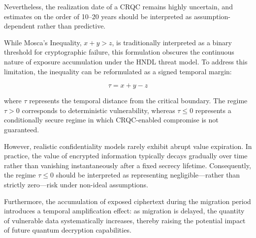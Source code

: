 \documentclass[11pt,a4paper]{article}
\begin{document}
Nevertheless, the realization date of a CRQC remains highly uncertain, and estimates on the order of 10--20 years should be interpreted as assumption-dependent rather than predictive.

While Mosca’s Inequality, $x + y > z$, is traditionally interpreted as a binary threshold for cryptographic failure, this formulation obscures the continuous nature of exposure accumulation under the HNDL threat model. To address this limitation, the inequality can be reformulated as a signed temporal margin:

\[
\tau = x + y - z
\]

where $\tau$ represents the temporal distance from the critical boundary. The regime $\tau > 0$ corresponds to deterministic vulnerability, whereas $\tau \leq 0$ represents a conditionally secure regime in which CRQC-enabled compromise is not guaranteed.

However, realistic confidentiality models rarely exhibit abrupt value expiration. In practice, the value of encrypted information typically decays gradually over time rather than vanishing instantaneously after a fixed secrecy lifetime. Consequently, the regime $\tau \leq 0$ should be interpreted as representing negligible---rather than strictly zero---risk under non-ideal assumptions.

Furthermore, the accumulation of exposed ciphertext during the migration period introduces a temporal amplification effect: as migration is delayed, the quantity of vulnerable data systematically increases, thereby raising the potential impact of future quantum decryption capabilities.
\end{document}
